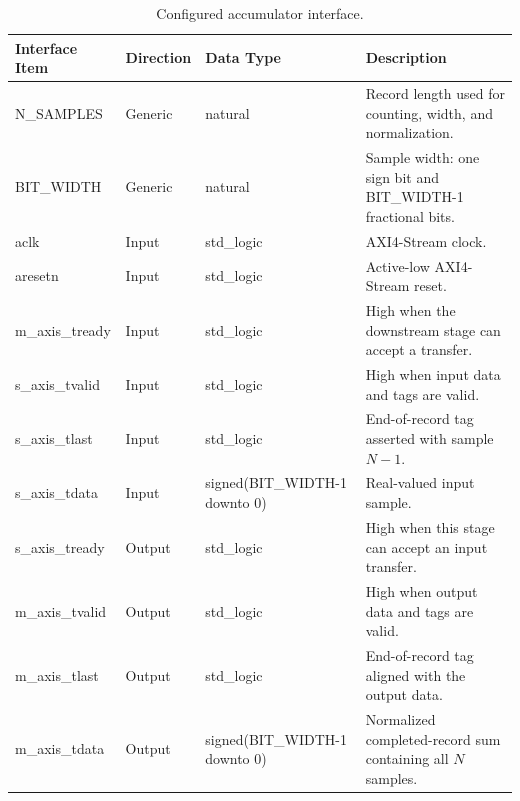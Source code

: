 \begin{table}[H]
\singlespacing
\small
\setlength{\tabcolsep}{2pt}
\renewcommand{\arraystretch}{0.95}
\begin{center}
\caption{Configured accumulator interface.}
\begin{tabularx}{\textwidth}{|L{0.24\textwidth}|L{0.13\textwidth}|L{0.28\textwidth}|Y|}
\hline
\textbf{Interface Item} & \textbf{Direction} & \textbf{Data Type} & \textbf{Description} \\
\hline
N\_SAMPLES     & Generic & natural & Record length used for counting, width, and normalization. \\
\hline
BIT\_WIDTH     & Generic & natural & Sample width: one sign bit and BIT\_WIDTH-1 fractional bits. \\
\hline
aclk           & Input & std\_logic & AXI4-Stream clock. \\
\hline
aresetn        & Input & std\_logic & Active-low AXI4-Stream reset. \\
\hline
m\_axis\_tready & Input & std\_logic & High when the downstream stage can accept a transfer. \\
\hline
s\_axis\_tvalid & Input & std\_logic & High when input data and tags are valid. \\
\hline
s\_axis\_tlast & Input & std\_logic & End-of-record tag asserted with sample $N-1$. \\
\hline
s\_axis\_tdata & Input & signed(BIT\_WIDTH-1 \newline downto 0) & Real-valued input sample. \\
\hline
s\_axis\_tready & Output & std\_logic & High when this stage can accept an input transfer. \\
\hline
m\_axis\_tvalid & Output & std\_logic & High when output data and tags are valid. \\
\hline
m\_axis\_tlast & Output & std\_logic & End-of-record tag aligned with the output data. \\
\hline
m\_axis\_tdata & Output & signed(BIT\_WIDTH-1 \newline downto 0) & Normalized completed-record sum containing all $N$ samples. \\
\hline
\end{tabularx}
\end{center}
\end{table}

\clearpage

